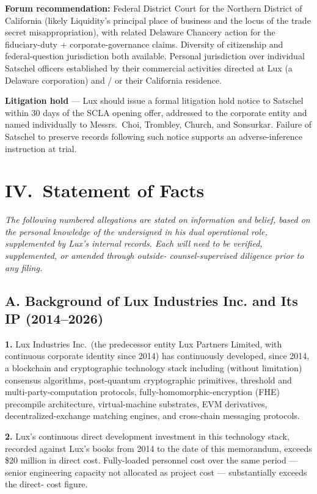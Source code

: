\documentclass[11pt,letterpaper]{article}
\begin{document}
\textbf{Forum recommendation:} Federal District Court for the Northern
District of California (likely Liquidity's principal place of business
and the locus of the trade secret misappropriation), with related
Delaware Chancery action for the fiduciary-duty + corporate-governance
claims. Diversity of citizenship and federal-question jurisdiction
both available. Personal jurisdiction over individual Satschel officers
established by their commercial activities directed at Lux (a Delaware
corporation) and / or their California residence.

\textbf{Litigation hold} --- Lux should issue a formal litigation
hold notice to Satschel within 30 days of the SCLA opening offer,
addressed to the corporate entity and named individually to Messrs.\
Choi, Trombley, Church, and Sonsurkar. Failure of Satschel to preserve
records following such notice supports an adverse-inference instruction
at trial.

\section*{IV.\ Statement of Facts}

\textit{The following numbered allegations are stated on information
and belief, based on the personal knowledge of the undersigned in his
dual operational role, supplemented by Lux's internal records. Each
will need to be verified, supplemented, or amended through outside-
counsel-supervised diligence prior to any filing.}

\subsection*{A. Background of Lux Industries Inc. and Its IP (2014--2026)}

\textbf{1.} Lux Industries Inc.\ (the predecessor entity Lux Partners
Limited, with continuous corporate identity since 2014) has continuously
developed, since 2014, a blockchain and cryptographic technology stack
including (without limitation) consensus algorithms, post-quantum
cryptographic primitives, threshold and multi-party-computation
protocols, fully-homomorphic-encryption (FHE) precompile architecture,
virtual-machine substrates, EVM derivatives, decentralized-exchange
matching engines, and cross-chain messaging protocols.

\textbf{2.} Lux's continuous direct development investment in this
technology stack, recorded against Lux's books from 2014 to the date
of this memorandum, exceeds \$20 million in direct cost. Fully-loaded
personnel cost over the same period --- senior engineering capacity
not allocated as project cost --- substantially exceeds the direct-
cost figure.
\end{document}
